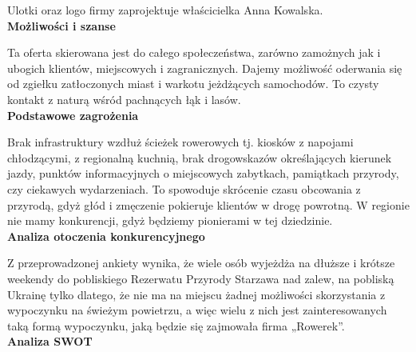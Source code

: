 \documentclass{sprawozdanie-agh}
\begin{document}
		Ulotki oraz logo firmy zaprojektuje właścicielka Anna Kowalska.\\
		\textbf{Możliwości i szanse}
		
		Ta oferta skierowana jest do całego społeczeństwa, zarówno zamożnych jak i ubogich klientów, miejscowych i zagranicznych. Dajemy możliwość oderwania się od zgiełku zatłoczonych miast i warkotu jeżdżących samochodów. To czysty kontakt z naturą wśród pachnących łąk i lasów.\\
		\textbf{Podstawowe zagrożenia}
		
		Brak infrastruktury wzdłuż ścieżek rowerowych tj. kiosków z napojami chłodzącymi, z regionalną kuchnią, brak drogowskazów określających kierunek jazdy, punktów informacyjnych o miejscowych zabytkach, pamiątkach przyrody, czy ciekawych wydarzeniach. To spowoduje skrócenie czasu obcowania z przyrodą, gdyż głód i zmęczenie pokieruje klientów w drogę powrotną. W regionie nie mamy konkurencji, gdyż będziemy pionierami w tej dziedzinie.\\
		\textbf{Analiza otoczenia konkurencyjnego}
		
		Z przeprowadzonej ankiety wynika, że wiele osób wyjeżdża na dłuższe i krótsze weekendy do pobliskiego Rezerwatu Przyrody Starzawa nad zalew, na pobliską Ukrainę tylko dlatego, że nie ma na miejscu żadnej możliwości skorzystania z wypoczynku na świeżym powietrzu, a więc wielu z nich jest zainteresowanych taką formą wypoczynku, jaką będzie się zajmowała firma „Rowerek”.\\
		\textbf{Analiza SWOT}
		
\end{document}
